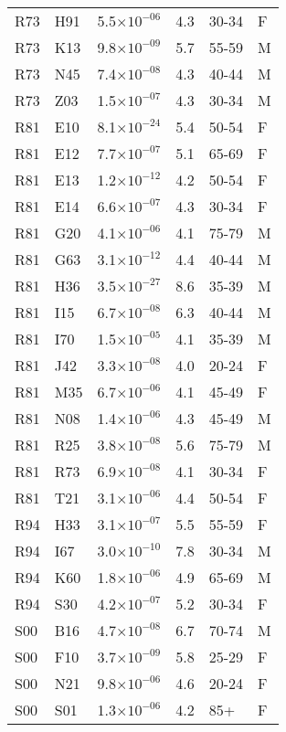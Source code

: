 \begin{longtable}{lllrll}
   R73 & H91 & 5.5$\times10^{-06}$ & 4.3 & 30-34 & F \\ 
   R73 & K13 & 9.8$\times10^{-09}$ & 5.7 & 55-59 & M \\ 
   R73 & N45 & 7.4$\times10^{-08}$ & 4.3 & 40-44 & M \\ 
   R73 & Z03 & 1.5$\times10^{-07}$ & 4.3 & 30-34 & M \\ 
   R81 & E10 & 8.1$\times10^{-24}$ & 5.4 & 50-54 & F \\ 
   R81 & E12 & 7.7$\times10^{-07}$ & 5.1 & 65-69 & F \\ 
   R81 & E13 & 1.2$\times10^{-12}$ & 4.2 & 50-54 & F \\ 
   R81 & E14 & 6.6$\times10^{-07}$ & 4.3 & 30-34 & F \\ 
   R81 & G20 & 4.1$\times10^{-06}$ & 4.1 & 75-79 & M \\ 
   R81 & G63 & 3.1$\times10^{-12}$ & 4.4 & 40-44 & M \\ 
   R81 & H36 & 3.5$\times10^{-27}$ & 8.6 & 35-39 & M \\ 
   R81 & I15 & 6.7$\times10^{-08}$ & 6.3 & 40-44 & M \\ 
   R81 & I70 & 1.5$\times10^{-05}$ & 4.1 & 35-39 & M \\ 
   R81 & J42 & 3.3$\times10^{-08}$ & 4.0 & 20-24 & F \\ 
   R81 & M35 & 6.7$\times10^{-06}$ & 4.1 & 45-49 & F \\ 
   R81 & N08 & 1.4$\times10^{-06}$ & 4.3 & 45-49 & M \\ 
   R81 & R25 & 3.8$\times10^{-08}$ & 5.6 & 75-79 & M \\ 
   R81 & R73 & 6.9$\times10^{-08}$ & 4.1 & 30-34 & F \\ 
   R81 & T21 & 3.1$\times10^{-06}$ & 4.4 & 50-54 & F \\ 
   R94 & H33 & 3.1$\times10^{-07}$ & 5.5 & 55-59 & F \\ 
   R94 & I67 & 3.0$\times10^{-10}$ & 7.8 & 30-34 & M \\ 
   R94 & K60 & 1.8$\times10^{-06}$ & 4.9 & 65-69 & M \\ 
   R94 & S30 & 4.2$\times10^{-07}$ & 5.2 & 30-34 & F \\ 
   S00 & B16 & 4.7$\times10^{-08}$ & 6.7 & 70-74 & M \\ 
   S00 & F10 & 3.7$\times10^{-09}$ & 5.8 & 25-29 & F \\ 
   S00 & N21 & 9.8$\times10^{-06}$ & 4.6 & 20-24 & F \\ 
   S00 & S01 & 1.3$\times10^{-06}$ & 4.2 & 85+ & F \\ 

\end{longtable}

